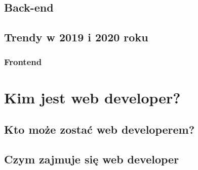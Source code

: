 \documentclass[12pt]{report}
\begin{document}
	\section{Back-end}
	\newpage
	\section{Trendy w 2019 i 2020 roku}
	\subsection{Frontend}


	\newpage
	\chapter{Kim jest web developer?}
	\section{Kto może zostać web developerem?}
	\newpage
	\section{Czym zajmuje się web developer}

	\listoffigures
	
\end{document}
